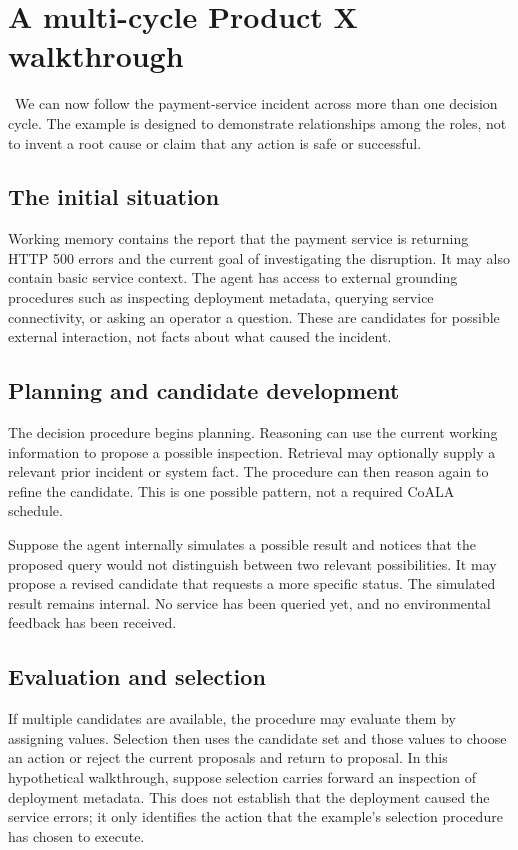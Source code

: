 \section{A multi-cycle Product X walkthrough}
\label{sec:productx-multi-cycle}

\BookExampleLabel\ We can now follow the payment-service incident across more than one decision cycle. The example is designed to demonstrate relationships among the roles, not to invent a root cause or claim that any action is safe or successful.

\subsection{The initial situation}

Working memory contains the report that the payment service is returning HTTP 500 errors and the current goal of investigating the disruption. It may also contain basic service context. The agent has access to external grounding procedures such as inspecting deployment metadata, querying service connectivity, or asking an operator a question. These are candidates for possible external interaction, not facts about what caused the incident.

\subsection{Planning and candidate development}

The decision procedure begins planning. Reasoning can use the current working information to propose a possible inspection. Retrieval may optionally supply a relevant prior incident or system fact. The procedure can then reason again to refine the candidate. This is one possible pattern, not a required CoALA schedule.

Suppose the agent internally simulates a possible result and notices that the proposed query would not distinguish between two relevant possibilities. It may propose a revised candidate that requests a more specific status. The simulated result remains internal. No service has been queried yet, and no environmental feedback has been received.

\subsection{Evaluation and selection}

If multiple candidates are available, the procedure may evaluate them by assigning values. Selection then uses the candidate set and those values to choose an action or reject the current proposals and return to proposal. In this hypothetical walkthrough, suppose selection carries forward an inspection of deployment metadata. This does not establish that the deployment caused the service errors; it only identifies the action that the example's selection procedure has chosen to execute.

